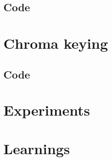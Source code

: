\documentclass[a4paper,11pt]{article}
\begin{document}
  \subsection{Code}
  
 
 \vspace{2em}
 \section{Chroma keying}
  \subsection{Code}
  
  \vspace{2em}
  
  \section*{Experiments}
  \section*{Learnings}
\end{document}
